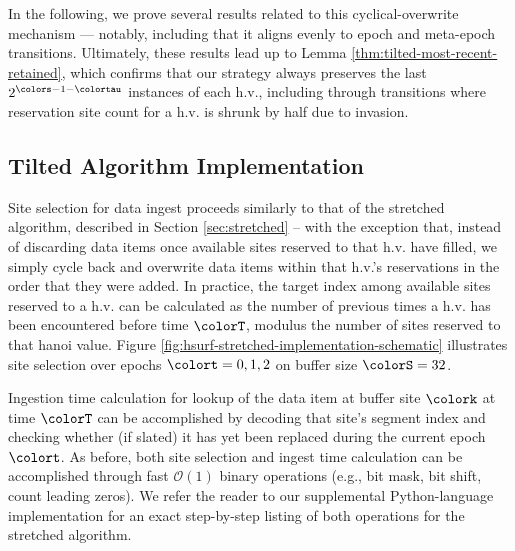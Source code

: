 In the following, we prove several results related to this cyclical-overwrite mechanism --- notably, including that it aligns evenly to epoch and meta-epoch transitions.
Ultimately, these results lead up to Lemma \ref{thm:tilted-most-recent-retained}, which confirms that our strategy always preserves the last $2^{\colors - 1 - \colortau}$ instances of each h.v., including through transitions where reservation site count for a h.v. is shrunk by half due to invasion.











\subsection{Tilted Algorithm Implementation}
\label{sec:tilted-implementation}



Site selection for data ingest proceeds similarly to that of the stretched algorithm, described in Section \ref{sec:stretched} -- with the exception that, instead of discarding data items once available sites reserved to that h.v. have filled, we simply cycle back and overwrite data items within that h.v.'s reservations in the order that they were added.
In practice, the target index among available sites reserved to a h.v. can be calculated as the number of previous times a h.v. has been encountered before time $\colorT$, modulus the number of sites reserved to that hanoi value.
Figure \ref{fig:hsurf-stretched-implementation-schematic} illustrates site selection over epochs $\colort=0,1,2$ on buffer size $\colorS=32$.

Ingestion time calculation for lookup of the data item at buffer site $\colork$ at time $\colorT$ can be accomplished by decoding that site's segment index and checking whether (if slated) it has yet been replaced during the current epoch $\colort$.
As before, both site selection and ingest time calculation can be accomplished through fast $\mathcal{O}(1)$ binary operations (e.g., bit mask, bit shift, count leading zeros).
We refer the reader to our supplemental Python-language implementation for an exact step-by-step listing of both operations for the stretched algorithm.

